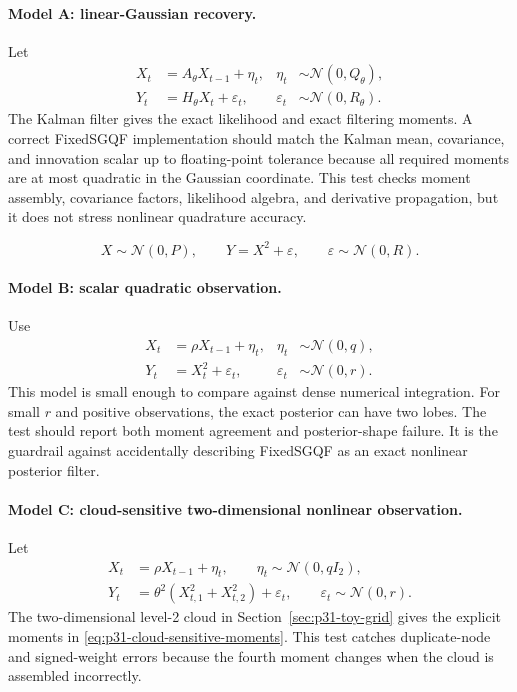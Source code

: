 \documentclass[11pt]{article}
\numberwithin{equation}{section}
\newcommand{\N}{\mathcal N}
\begin{document}
\paragraph{Model A: linear-Gaussian recovery.}
Let
\begin{align}
  X_t &= A_\theta X_{t-1}+\eta_t,
  &
  \eta_t&\sim\N(0,Q_\theta),
  \label{eq:p32-test-lg-state}\\
  Y_t &= H_\theta X_t+\varepsilon_t,
  &
  \varepsilon_t&\sim\N(0,R_\theta).
  \label{eq:p32-test-lg-obs}
\end{align}
The Kalman filter gives the exact likelihood and exact filtering moments.  A
correct FixedSGQF implementation should match the Kalman mean, covariance, and
innovation scalar up to floating-point tolerance because all required moments
are at most quadratic in the Gaussian coordinate.  This test checks moment
assembly, covariance factors, likelihood algebra, and derivative propagation,
but it does not stress nonlinear quadrature accuracy.

\begin{equation}
  X\sim\N(0,P),\qquad Y=X^2+\varepsilon,\qquad
  \varepsilon\sim\N(0,R).
  \label{eq:p31-quadratic-cell}
\end{equation}

\paragraph{Model B: scalar quadratic observation.}
Use
\begin{align}
  X_t &= \rho X_{t-1}+\eta_t,
  &
  \eta_t&\sim\N(0,q),
  \label{eq:p32-test-quad-state}\\
  Y_t &= X_t^2+\varepsilon_t,
  &
  \varepsilon_t&\sim\N(0,r).
  \label{eq:p32-test-quad-obs}
\end{align}
This model is small enough to compare against dense numerical integration.
For small \(r\) and positive observations, the exact posterior can have two
lobes.  The test should report both moment agreement and posterior-shape
failure.  It is the guardrail against accidentally describing FixedSGQF as an
exact nonlinear posterior filter.

\paragraph{Model C: cloud-sensitive two-dimensional nonlinear observation.}
Let
\begin{align}
  X_t&=\rho X_{t-1}+\eta_t,\qquad
  \eta_t\sim\N(0,qI_2),
  \label{eq:p32-test-cloud-state}\\
  Y_t&=\theta^2(X_{t,1}^2+X_{t,2}^2)+\varepsilon_t,\qquad
  \varepsilon_t\sim\N(0,r).
  \label{eq:p32-test-cloud-obs}
\end{align}
The two-dimensional level-2 cloud in Section~\ref{sec:p31-toy-grid} gives the
explicit moments in \eqref{eq:p31-cloud-sensitive-moments}.  This test catches
duplicate-node and signed-weight errors because the fourth moment changes when
the cloud is assembled incorrectly.
\end{document}
